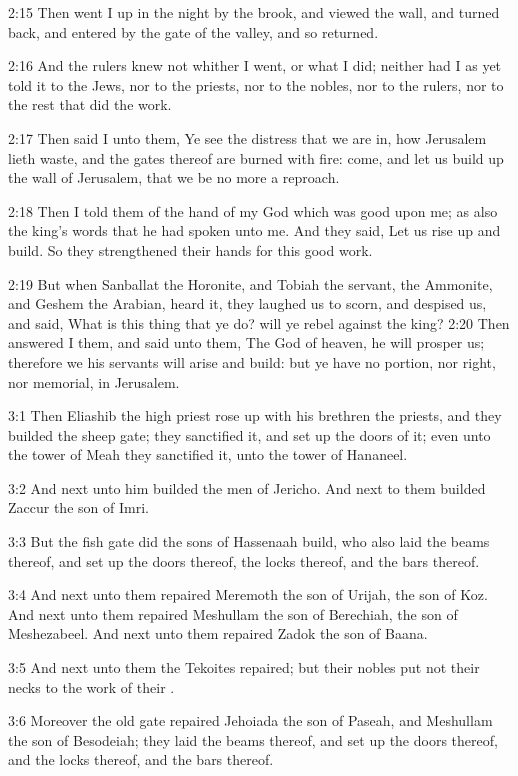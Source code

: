 2:15 Then went I up in the night by the brook, and viewed the wall, and turned back, and entered by the gate of the valley, and so returned.

2:16 And the rulers knew not whither I went, or what I did; neither had I as yet told it to the Jews, nor to the priests, nor to the nobles, nor to the rulers, nor to the rest that did the work.

2:17 Then said I unto them, Ye see the distress that we are in, how Jerusalem lieth waste, and the gates thereof are burned with fire: come, and let us build up the wall of Jerusalem, that we be no more a reproach.

2:18 Then I told them of the hand of my God which was good upon me; as also the king's words that he had spoken unto me. And they said, Let us rise up and build. So they strengthened their hands for this good work.

2:19 But when Sanballat the Horonite, and Tobiah the servant, the Ammonite, and Geshem the Arabian, heard it, they laughed us to scorn, and despised us, and said, What is this thing that ye do? will ye rebel against the king?  2:20 Then answered I them, and said unto them, The God of heaven, he will prosper us; therefore we his servants will arise and build: but ye have no portion, nor right, nor memorial, in Jerusalem.

3:1 Then Eliashib the high priest rose up with his brethren the priests, and they builded the sheep gate; they sanctified it, and set up the doors of it; even unto the tower of Meah they sanctified it, unto the tower of Hananeel.

3:2 And next unto him builded the men of Jericho. And next to them builded Zaccur the son of Imri.

3:3 But the fish gate did the sons of Hassenaah build, who also laid the beams thereof, and set up the doors thereof, the locks thereof, and the bars thereof.

3:4 And next unto them repaired Meremoth the son of Urijah, the son of Koz. And next unto them repaired Meshullam the son of Berechiah, the son of Meshezabeel. And next unto them repaired Zadok the son of Baana.

3:5 And next unto them the Tekoites repaired; but their nobles put not their necks to the work of their \LORD.

3:6 Moreover the old gate repaired Jehoiada the son of Paseah, and Meshullam the son of Besodeiah; they laid the beams thereof, and set up the doors thereof, and the locks thereof, and the bars thereof.

